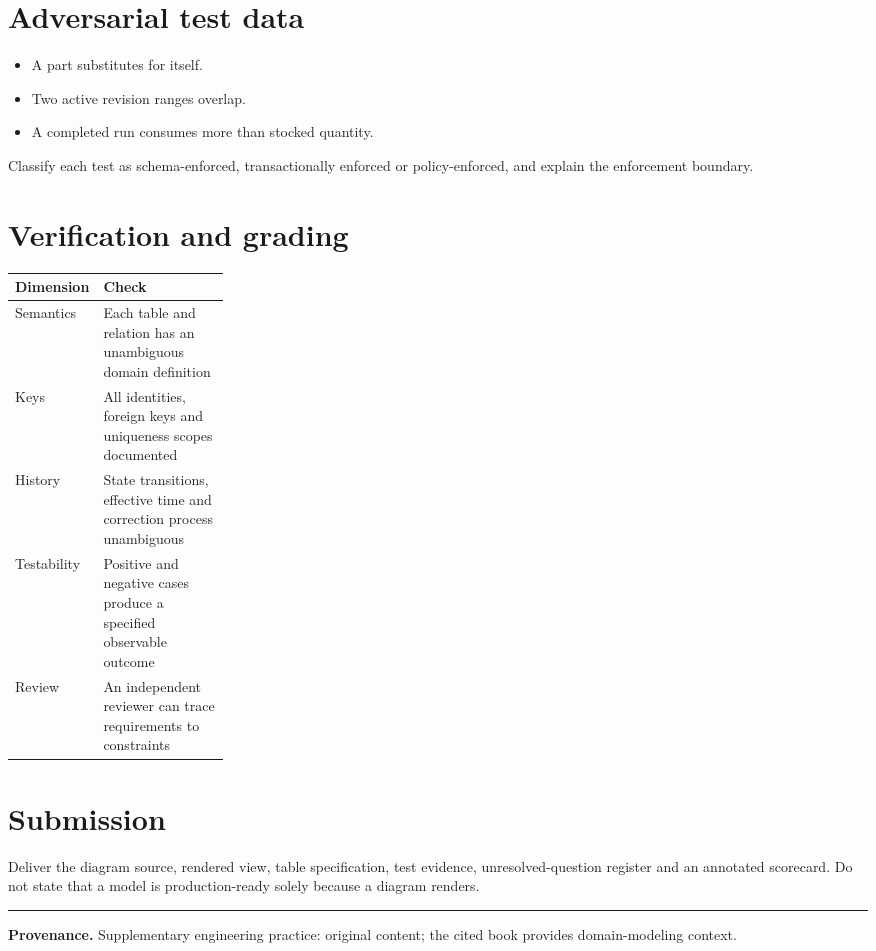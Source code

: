 \documentclass[11pt,letterpaper]{article}
\begin{document}
\section{Adversarial test data}
\begin{itemize}
\item A part substitutes for itself.
\item Two active revision ranges overlap.
\item A completed run consumes more than stocked quantity.
\end{itemize}
Classify each test as schema-enforced, transactionally enforced or policy-enforced, and explain the enforcement boundary.


\section{Verification and grading}
\begin{tabularx}{\linewidth}{@{}>{\raggedright\arraybackslash}p{0.25\linewidth}>{\raggedright\arraybackslash}X@{}}
\toprule
\textbf{Dimension} & \textbf{Check} \\ 
\midrule
Semantics & Each table and relation has an unambiguous domain definition \\ 
Keys & All identities, foreign keys and uniqueness scopes documented \\ 
History & State transitions, effective time and correction process unambiguous \\ 
Testability & Positive and negative cases produce a specified observable outcome \\ 
Review & An independent reviewer can trace requirements to constraints \\ 
\bottomrule
\end{tabularx}

\section{Submission}
Deliver the diagram source, rendered view, table specification, test evidence, unresolved-question register and an annotated scorecard. Do not state that a model is production-ready solely because a diagram renders.


\vfill
\hrule
{\footnotesize\textbf{Provenance.} Supplementary engineering practice: original content; the cited book provides domain-modeling context.}
\end{document}
